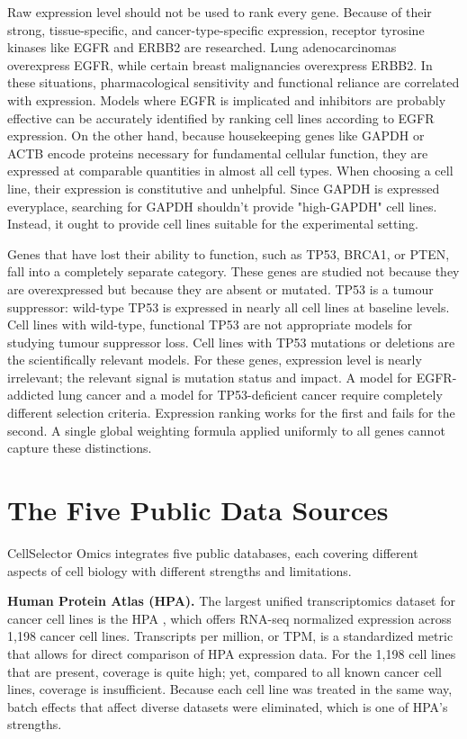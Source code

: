 \documentclass[author={Karen Coutinho, Ishaan Bhalla, Aman Raj, Dixit Kaloorani Malarmannan},
                supervisor={Dr. Daniel D'Andrea},
                degree={MSc},
                title={CellSelector Omics: A Multi-Omics Recommendation System for Cell Line Selection},
                subtitle={},
                type={},
                year={2026}]{dissertation}
\begin{document}
Raw expression level should not be used to rank every gene. Because of their strong, tissue-specific, and cancer-type-specific expression, receptor tyrosine kinases like EGFR and ERBB2 are researched. Lung adenocarcinomas overexpress EGFR, while certain breast malignancies overexpress ERBB2. In these situations, pharmacological sensitivity and functional reliance are correlated with expression. Models where EGFR is implicated and inhibitors are probably effective can be accurately identified by ranking cell lines according to EGFR expression. On the other hand, because housekeeping genes like GAPDH or ACTB encode proteins necessary for fundamental cellular function, they are expressed at comparable quantities in almost all cell types. When choosing a cell line, their expression is constitutive and unhelpful. Since GAPDH is expressed everyplace, searching for GAPDH shouldn't provide "high-GAPDH" cell lines. Instead, it ought to provide cell lines suitable for the experimental setting.

Genes that have lost their ability to function, such as TP53, BRCA1, or PTEN, fall into a completely separate category. These genes are studied not because they are overexpressed but because they are absent or mutated. TP53 is a tumour suppressor: wild-type TP53 is expressed in nearly all cell lines at baseline levels. Cell lines with wild-type, functional TP53 are not appropriate models for studying tumour suppressor loss. Cell lines with TP53 mutations or deletions are the scientifically relevant models. For these genes, expression level is nearly irrelevant; the relevant signal is mutation status and impact. A model for EGFR-addicted lung cancer and a model for TP53-deficient cancer require completely different selection criteria. Expression ranking works for the first and fails for the second. A single global weighting formula applied uniformly to all genes cannot capture these distinctions.

\section{The Five Public Data Sources}

CellSelector Omics integrates five public databases, each covering different aspects of cell biology with different strengths and limitations.

{\bf Human Protein Atlas (HPA).} The largest unified transcriptomics dataset for cancer cell lines is the HPA \cite{uhlen2015proteome}, which offers RNA-seq normalized expression across 1,198 cancer cell lines. Transcripts per million, or TPM, is a standardized metric that allows for direct comparison of HPA expression data. For the 1,198 cell lines that are present, coverage is quite high; yet, compared to all known cancer cell lines, coverage is insufficient. Because each cell line was treated in the same way, batch effects that affect diverse datasets were eliminated, which is one of HPA's strengths. 
\end{document}
